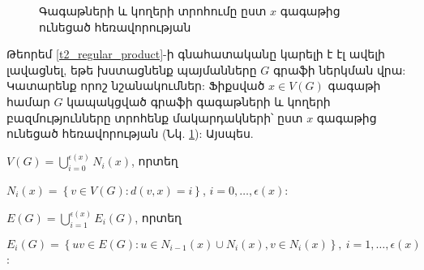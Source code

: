 \begin{figure}[t]
\caption{Գագաթների և կողերի տրոհումը ըստ $x$ գագաթից ունեցած հեռավորության}
\label{graphLevels}
\end{figure}

Թեորեմ \ref{t2_regular_product}-ի գնահատականը կարելի է էլ ավելի լավացնել, եթե խստացնենք պայմանները $G$ գրաֆի ներկման վրա: Կատարենք որոշ նշանակումներ: Ֆիքսված $x \in V(G)$ գագաթի համար $G$ կապակցված գրաֆի գագաթների և կողերի բազմությունները տրոհենք մակարդակների՝ ըստ $x$ գագաթից ունեցած հեռավորության (Նկ. \ref{graphLevels}): Այսպես. 
\begin{center}
$V(G) = \bigcup\limits_{i=0}^{\epsilon(x)}N_i(x)$, որտեղ 
\end{center}
\begin{center}
$N_i(x)=\left\{ v \in V(G) : d(v,x)=i \right\}$, $i=0,\ldots,\epsilon(x)$: 
\end{center}
\begin{center}
$E(G) = \bigcup\limits_{i=1}^{\epsilon(x)}E_i(G)$, որտեղ
\end{center}
\begin{center}
$E_i(G)=\left\{ uv \in E(G) : u \in N_{i-1}(x)\cup N_i(x), v\in N_i(x) \right\},\ i=1,\ldots,\epsilon(x)$:
\end{center}

